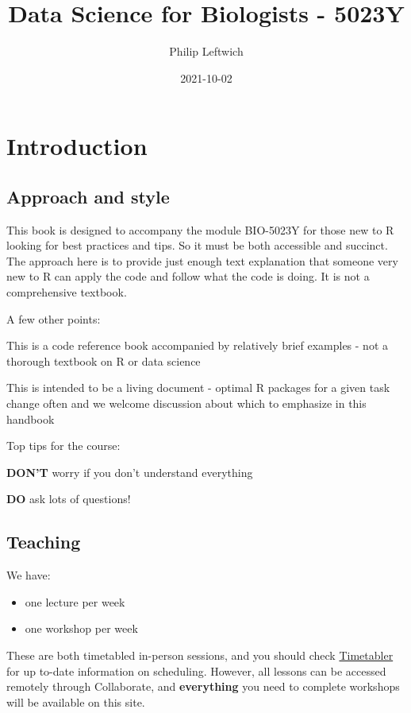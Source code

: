 \documentclass[
]{book}
\title{Data Science for Biologists - 5023Y}
\author{Philip Leftwich}
\date{2021-10-02}
\providecommand{\tightlist}{%
  \setlength{\itemsep}{0pt}\setlength{\parskip}{0pt}}
\begin{document}
\maketitle

{
\setcounter{tocdepth}{1}
\tableofcontents
}
\hypertarget{introduction}{%
\chapter{Introduction}\label{introduction}}

\hypertarget{approach-and-style}{%
\section{Approach and style}\label{approach-and-style}}

This book is designed to accompany the module BIO-5023Y for those new to R looking for best practices and tips. So it must be both accessible and succinct. The approach here is to provide just enough text explanation that someone very new to R can apply the code and follow what the code is doing. It is not a comprehensive textbook.

A few other points:

This is a code reference book accompanied by relatively brief examples - not a thorough textbook on R or data science

This is intended to be a living document - optimal R packages for a given task change often and we welcome discussion about which to emphasize in this handbook

Top tips for the course:

\textbf{DON'T} worry if you don't understand everything

\textbf{DO} ask lots of questions!

\hypertarget{teaching}{%
\section{Teaching}\label{teaching}}

We have:

\begin{itemize}
\tightlist
\item
  one lecture per week
\item
  one workshop per week
\end{itemize}

These are both timetabled in-person sessions, and you should check \href{https://timetabler.uea.ac.uk/Timetable}{Timetabler} for up to-date information on scheduling. However, all lessons can be accessed remotely through Collaborate, and \textbf{everything} you need to complete workshops will be available on this site.
\end{document}
